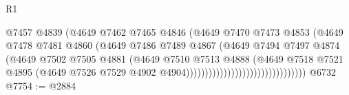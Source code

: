 \begin{lexlean}{R1}
\begin{coremodule}
                                                  @7457
                                                  @4839
                                                  (@4649
                                                    @7462
                                                    @7465
                                                    @4846
                                                    (@4649
                                                      @7470
                                                      @7473
                                                      @4853
                                                      (@4649
                                                        @7478
                                                        @7481
                                                        @4860
                                                        (@4649
                                                          @7486
                                                          @7489
                                                          @4867
                                                          (@4649
                                                            @7494
                                                            @7497
                                                            @4874
                                                            (@4649
                                                              @7502
                                                              @7505
                                                              @4881
                                                              (@4649
                                                                @7510
                                                                @7513
                                                                @4888
                                                                (@4649
                                                                  @7518
                                                                  @7521
                                                                  @4895
                                                                  (@4649
                                                                    @7526
                                                                    @7529
                                                                    @4902
                                                                    @4904))))))))))))))))))))))))))))))))
    @6732
@7754 := @2884

\end{coremodule}
\end{lexlean}
